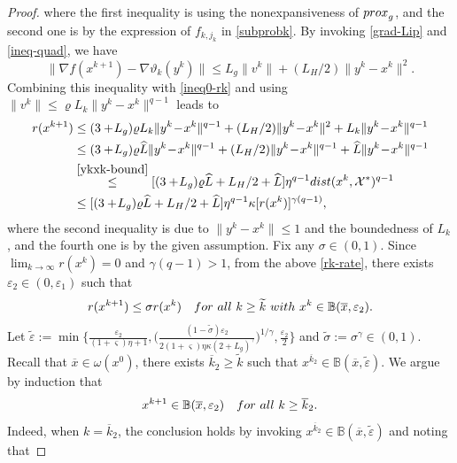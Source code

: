 \documentclass[10pt,a4paper]{amsart}
\begin{document}
\begin{proof}
  where the first inequality is using the nonexpansiveness of ${\rm prox}_g$, and the second one is by the expression of $f_{k,j_k}$ in \eqref{subprobk}. By invoking \eqref{grad-Lip} and \eqref{ineq-quad}, we have
  \[
   \|\nabla\!f(x^{k+1})\!-\!\nabla\vartheta_k(y^k)\|
   \le L_g\|v^k\|+({L_H}/{2})\|y^k\!-\!x^k\|^{2}.
  \]
  Combining this inequality with \eqref{ineq0-rk} and using $\|v^k\|\le\varrho L_k\|y^k\!-\!x^k\|^{q-1}$ leads to  
  \begin{align}\label{rk-rate}
   r(x^{k+1})
   &\le (3+\!L_g)\varrho L_k\|y^k\!-\!x^k\|^{q-1}+({L_H}/{2})\|y^k\!-\!x^k\|^{2}+L_k\|y^k\!-\!x^k\|^{q-1}\nonumber\\
   &\le(3+\!L_g)\varrho \widehat{L}\|y^k\!-\!x^k\|^{q-1}+({L_H}/{2})\|y^k\!-\!x^k\|^{q-1}+\widehat{L}\|y^k\!-\!x^k\|^{q-1}\nonumber\\
   &\stackrel{\eqref{ykxk-bound}}{\le}[(3+\!L_g)\varrho \widehat{L}+L_H/2+\widehat{L}]\eta^{q-1}{\rm dist}(x^k,\mathcal{X}^*)^{q-1}\nonumber\\
   &\le[(3+\!L_g)\varrho \widehat{L}+L_H/2+\widehat{L}]\eta^{q-1}\kappa[r(x^k)]^{\gamma(q-1)},
  \end{align}
  where the second inequality is due to $\|y^k\!-\!x^k\|\le 1$ and the boundedness of $L_k$,  and the fourth one is by the given assumption. Fix  any $\sigma\in(0,1)$. Since $\lim_{k\to\infty}r(x^k)=0$ and $\gamma(q\!-\!1)>1$, from the above \eqref{rk-rate}, there exists $\varepsilon_2\in(0,\varepsilon_1)$ such that 
  \begin{equation}\label{rk-recursion}
   r(x^{k+1})\le\sigma r(x^k)\quad{\rm for\ all}\ k\ge \widetilde{k}\ {\rm with}\ x^k\in\mathbb{B}(\overline{x},\varepsilon_2).
  \end{equation}
  Let $\widetilde{\varepsilon}\!:=\min\{\frac{\varepsilon_2}{(1+\varsigma)\eta+1},\big(\frac{(1-\widetilde{\sigma})\varepsilon_2}{2(1+\varsigma)\eta\kappa(2+L_g)^{\gamma}}\big)^{1/\gamma},\frac{\varepsilon_2}{2}\}$ and $\widetilde{\sigma}:=\sigma^{\gamma}\in(0,1)$. 
  Recall that $\overline{x}\in\omega(x^0)$, there exists $\overline{k}_2\ge \widetilde{k}$ such that $x^{\overline{k}_2}\in\mathbb{B}(\overline{x},\widetilde{\varepsilon})$. We argue by induction that 
  \begin{equation}\label{induction}
  x^{k+1}\in\mathbb{B}(\overline{x},\varepsilon_2)\quad{\rm for\ all}\  k\ge \overline{k}_2. 
  \end{equation}
  Indeed, when $k=\overline{k}_2$, the conclusion holds by invoking $x^{\overline{k}_2}\in\mathbb{B}(\overline{x},\widetilde{\varepsilon})$ and noting that

\end{proof}
\end{document}
